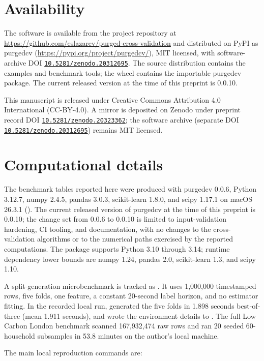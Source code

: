 \documentclass[11pt]{article}
\newcommand{\pcv}{\textsf{purgedcv}}
\newcommand{\pkg}[1]{\textsf{#1}}
\DeclareRobustCommand{\code}[1]{\texttt{\detokenize{#1}}}
\newcommand{\doi}[1]{\href{https://doi.org/#1}{\nolinkurl{#1}}}
\begin{document}
\section*{Availability}

The software is available from the project repository at
\url{https://github.com/eslazarev/purged-cross-validation} and distributed on
PyPI as \pkg{purgedcv} (\url{https://pypi.org/project/purgedcv/}), MIT
licensed, with software-archive DOI \doi{10.5281/zenodo.20312695}. The source
distribution contains the examples and benchmark tools; the wheel contains the
importable \pcv{} package. The current released version at the time of this
preprint is 0.0.10.

This manuscript is released under Creative Commons Attribution 4.0
International (CC-BY-4.0). A mirror is deposited on Zenodo under preprint
record DOI \doi{10.5281/zenodo.20323362}; the software archive (separate DOI
\doi{10.5281/zenodo.20312695}) remains MIT licensed.

\section*{Computational details}

The benchmark tables reported here were produced with \pcv{} 0.0.6, Python
3.12.7, \pkg{numpy} 2.4.5, \pkg{pandas} 3.0.3, \pkg{scikit-learn} 1.8.0, and
\pkg{scipy} 1.17.1 on macOS 26.3.1 (\code{arm64}). The current released
version of \pcv{} at the time of this preprint is 0.0.10; the change set from
0.0.6 to 0.0.10 is limited to input-validation hardening, CI tooling, and
documentation, with no changes to the cross-validation algorithms or to the
numerical paths exercised by the reported computations. The package supports
Python 3.10 through 3.14; runtime dependency lower bounds are \pkg{numpy}
1.24, \pkg{pandas} 2.0, \pkg{scikit-learn} 1.3, and \pkg{scipy} 1.10.

A split-generation microbenchmark is tracked as \code{tools/microbench.py}. It
uses 1,000,000 timestamped rows, five folds, one feature, a constant 20-second
label horizon, and no estimator fitting. In the recorded local run,
\code{PurgedKFold} generated the five folds in 1.898 seconds best-of-three
(mean 1.911 seconds), and wrote the environment details to
.
The full Low Carbon London benchmark scanned 167,932,474 raw rows and ran 20
seeded 60-household subsamples in 53.8 minutes on the author's local machine.

The main local reproduction commands are:
\end{document}
